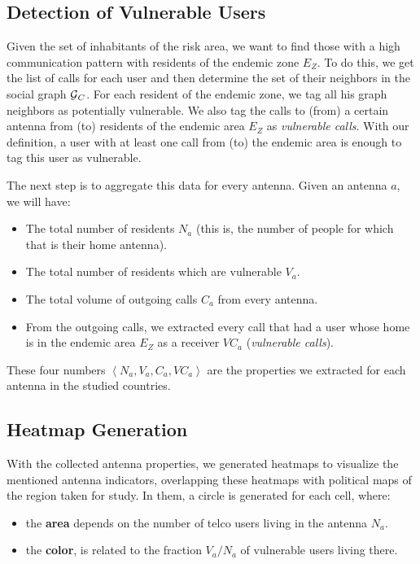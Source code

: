 \subsection{Detection of Vulnerable Users}\label{subsection:vulnerable_users_detection}

Given the set of inhabitants of the risk area, we want to find those with a high communication pattern with residents of the endemic zone $E_Z$.
To do this, we get the list of calls for each user and then determine the set of their neighbors in the social graph $\operatorname{\mathcal{G}}_C$.
For each resident of the endemic zone, we tag all his graph neighbors as potentially vulnerable.
We also tag the calls to (from) a certain antenna from (to) residents of the endemic area $E_Z$ as \textit{vulnerable calls}.
With our definition, a user with at least one call from (to) the endemic area is enough to tag this user as vulnerable.

The next step is to aggregate this data for every antenna.
Given an antenna $a$, we will have:
\begin{itemize}
	\item The total number of residents $N_a$ (this is, the number of people for which that is their home antenna).
	\item The total number of residents which are vulnerable $V_a$.
	\item The total volume of outgoing calls $C_a$ from every antenna.
	\item From the outgoing calls, we extracted every call that had a user whose home is in the endemic area $E_Z$ as a receiver $VC_a$ (\textit{vulnerable calls}).
\end{itemize}

These four numbers $\left< N_a, V_a, C_a, VC_a \right>$ are the properties we extracted for each antenna in the studied countries.


\subsection{Heatmap Generation}
With the collected antenna properties, we generated heatmaps to visualize the mentioned antenna indicators, overlapping these heatmaps with political maps of the region taken for study.
In them, a circle is generated for each cell, where:
\begin{itemize}
	\item the \textbf{area} depends on the number of telco users living in the antenna $N_a$.
	\item the \textbf{color}, is related to the fraction ${V_a}/{N_a}$ of vulnerable users living there.
\end{itemize}

